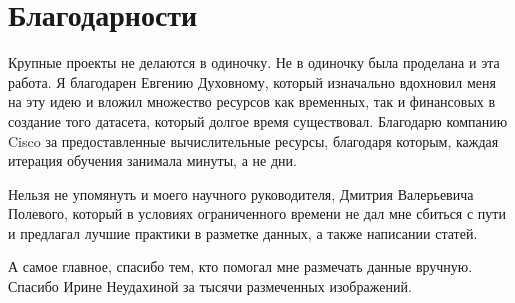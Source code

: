 \section*{Благодарности}

Крупные проекты не делаются в одиночку. Не в одиночку была проделана и эта работа. Я благодарен Евгению Духовному, который изначально вдохновил меня на эту идею и вложил множество ресурсов как временных, так и финансовых в создание того датасета, который долгое время существовал. Благодарю компанию Cisco за предоставленные вычислительные ресурсы, благодаря которым, каждая итерация обучения занимала минуты, а не дни. 

Нельзя не упомянуть и моего научного руководителя, Дмитрия Валерьевича Полевого, который в условиях ограниченного времени не дал мне сбиться с пути и предлагал лучшие практики в разметке данных, а также написании статей.

А самое главное, спасибо тем, кто помогал мне размечать данные вручную. Спасибо Ирине Неудахиной за тысячи размеченных изображений. 